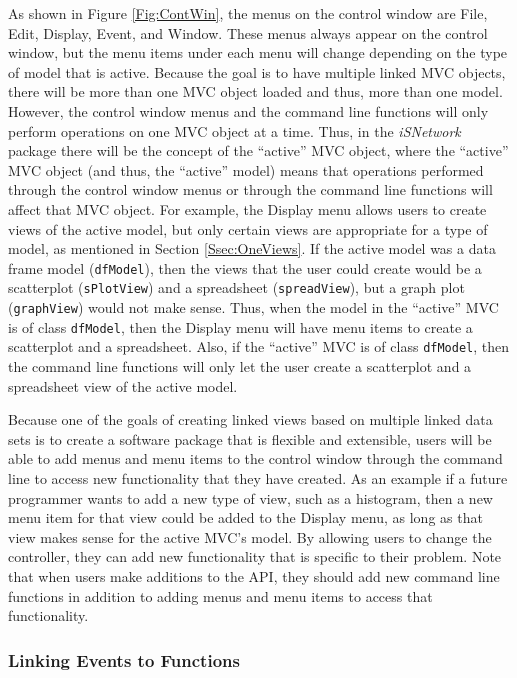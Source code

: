 \documentclass{article}[11pt]
\newcommand{\Robject}[1]{{\texttt{#1}}}
\newcommand{\Rpackage}[1]{{\textit{#1}}}
\begin{document}
As shown in Figure \ref{Fig:ContWin}, the menus on the control window are
File, Edit, Display, Event, and Window.  These menus always appear on the
control window, but the menu items under each menu will change depending on
the type of model that is active.  Because the goal is to have multiple
linked MVC objects, there will be more than one MVC object loaded and thus,
more than one model. However, the control window menus and the command line
functions will only perform operations on one MVC object at a time.  Thus, in
the \Rpackage{iSNetwork} package there will be the concept of the ``active''
MVC object, where the ``active'' MVC object (and thus, the ``active'' model)
means that operations performed through the control window menus or through
the command line functions will affect that MVC object.  For
example, the Display menu allows users to create views of the active model,
but only certain views are appropriate for a type of model, as mentioned in
Section \ref{Ssec:OneViews}.  If the active model was a data frame model
(\Robject{dfModel}), then the views that the user could create would be a
scatterplot (\Robject{sPlotView}) and a spreadsheet (\Robject{spreadView}),
but a graph plot (\Robject{graphView}) would not make sense.  Thus, when the
model in the ``active'' MVC is of class \Robject{dfModel}, then the Display
menu will have menu items to create a scatterplot and a spreadsheet.  Also, if
the ``active'' MVC is of class \Robject{dfModel}, then the command line
functions will only let the user create a scatterplot and a spreadsheet view
of the active model.

Because one of the goals of creating linked views based on multiple linked
data sets is to create a software package that is flexible and extensible,
users will be able to add menus and menu items to the control window through
the command line to access new functionality that they have created.  As an
example if a future programmer wants to add a new type of view, such as a
histogram, then a new menu item for that view could be added to the Display
menu, as long as that view makes sense for the active MVC's model.  By
allowing users to change the controller, they can add new functionality that
is specific to their problem.  Note that when users make additions to the API,
they should add new command line functions in addition to adding menus and
menu items to access that functionality.

\subsubsection{Linking Events to Functions}\label{Ssec:OneEvent}
\end{document}
